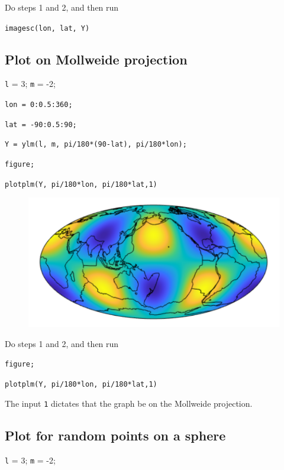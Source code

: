 \documentclass{article}
\begin{document}
\setlength{\parskip}{0.5cm plus4mm minus3mm}

Do steps 1 and 2, and then run

\verb+imagesc(lon, lat, Y)+

\subsection{Plot on Mollweide projection}

\setlength{\parskip}{.1mm}

\verb+l+ = 3; \verb+m+ = -2;

\verb+lon = 0:0.5:360;+

\verb+lat = -90:0.5:90;+

\verb+Y = ylm(l, m, pi/180*(90-lat), pi/180*lon);+

\verb+figure;+

\verb+plotplm(Y, pi/180*lon, pi/180*lat,1)+

\begin{figure}[H]
\includegraphics[scale=.8]{mollweide}
\end{figure}

\setlength{\parskip}{0.5cm plus4mm minus3mm}

Do steps 1 and 2, and then run

\verb+figure;+

\verb+plotplm(Y, pi/180*lon, pi/180*lat,1)+

The input \verb+1+ dictates that the graph be on the Mollweide projection.

\subsection{Plot for random points on a sphere}

\setlength{\parskip}{.1mm}

\verb+l+ = 3; \verb+m+ = -2;
\end{document}
